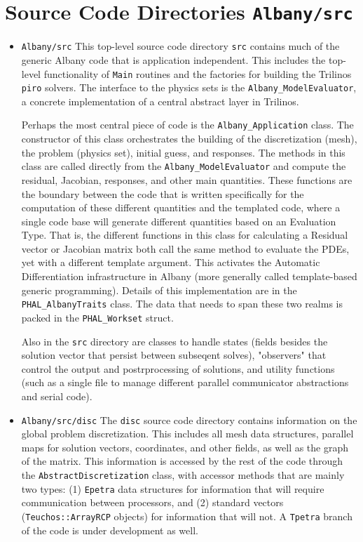 \documentclass[pdf,12pt,report,strict]{SANDreport}
\theoremstyle{remark}
\begin{document}
\section{Source Code Directories \texttt{Albany/src} }
\begin{itemize}

\item{\texttt{Albany/src}}  This top-level source code directory  \texttt{src} contains
much of the generic Albany code that is application independent. This includes the
top-level functionality of 
\texttt{Main} routines and the factories for building the Trilinos \texttt{piro} solvers.
The interface to the physics sets is the \texttt{Albany\_ModelEvaluator}, a concrete
implementation of a central abstract layer in Trilinos. 

Perhaps the most central piece of code is the \texttt{Albany\_Application} class.
The constructor of this class orchestrates the building of the discretization (mesh),
the problem (physics set), initial guess, and responses. The methods in this class
are called directly from the \texttt{Albany\_ModelEvaluator} and compute the residual,
Jacobian, responses, and other main quantities. These functions are the boundary between
the code that is written specifically for the computation of these different quantities
and the templated code, where a single code base will generate different quantities based
on an Evaluation Type. That is, the different functions in this class for calculating
a Residual vector or Jacobian matrix both call the same method to evaluate the PDEs, yet
with a different template argument. This activates the Automatic Differentiation 
infrastructure in Albany (more generally called template-based generic programming).
Details of this implementation are in the \texttt{PHAL\_AlbanyTraits} class. The data
that needs to span these two realms is packed in the \texttt{PHAL\_Workset} struct.

Also in the \texttt{src} directory are classes to handle states (fields besides the
solution vector that persist between subseqent solves), "observers" that control
the output and postrprocessing of solutions, and utility functions (such as a single
file to manage different parallel communicator abstractions and serial code).


\item{\texttt{Albany/src/disc}}  The \texttt{disc} source code directory contains information
on the global problem discretization. This includes all mesh data structures, parallel
maps for solution vectors, coordinates, and other fields, as well as the graph of the
matrix. This information is accessed by the rest of the code through the 
\texttt{AbstractDiscretization} class, with accessor methods that are mainly 
two types: (1) \texttt{Epetra} data structures for information that will 
require communication between processors, and (2)
standard vectors (\texttt{Teuchos::ArrayRCP} objects) for information that will not.
A \texttt{Tpetra} branch of the code is under development as well.


\end{itemize}
\end{document}
